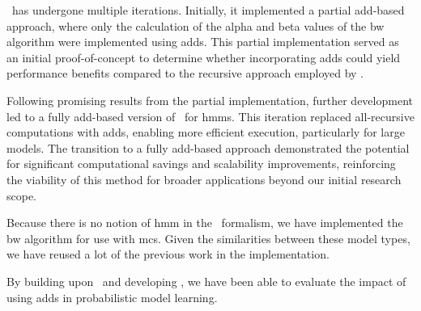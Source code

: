 \Cupaal\ has undergone multiple iterations.
Initially, it implemented a partial \gls{add}-based approach, where only the calculation of the alpha and beta values of the \gls{bw} algorithm were implemented using \glspl{add}.
This partial implementation served as an initial proof-of-concept to determine whether incorporating \glspl{add} could yield performance benefits compared to the recursive approach employed by \Jajapy.

Following promising results from the partial implementation, further development led to a fully \gls{add}-based version of \Cupaal\ for \glspl{hmm}.
This iteration replaced all-recursive computations with \glspl{add}, enabling more efficient execution, particularly for large models.
The transition to a fully \gls{add}-based approach demonstrated the potential for significant computational savings and scalability improvements, reinforcing the viability of this method for broader applications beyond our initial research scope.

Because there is no notion of \gls{hmm} in the \Prism\ formalism, we have implemented the \gls{bw} algorithm for use with \glspl{mc}.
Given the similarities between these model types, we have reused a lot of the previous work in the implementation.

By building upon \Jajapy\ and developing \Cupaal, we have been able to evaluate the impact of using \glspl{add} in probabilistic model learning.
